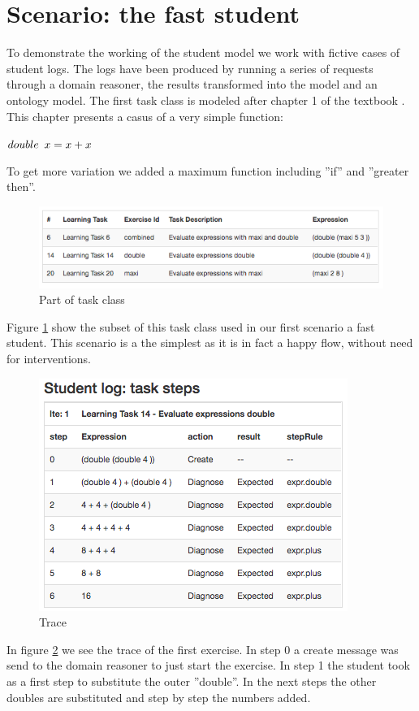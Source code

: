 \section{Scenario: the fast student}

To demonstrate the working of the student model  we work with fictive cases of student logs.
The logs have been produced by running a series of requests through a domain reasoner, the results transformed into the model and an ontology model.
The first task class is modeled after chapter 1 of the textbook \citep{hutton_2016}.
This chapter presents a casus of a very simple function:
\vspace{10pt}

$double  \hspace{5 pt} x = x + x$
\vspace{10pt}

To get more variation we added a maximum function including ''if'' and ''greater then''.

\begin{figure}
\includegraphics[scale=0.85]{pictures/screen01.png}
\caption{Part of task class}
\label{fig:screen01}
\end{figure}

Figure \ref{fig:screen01} show the subset of this task class used in our first scenario a fast student.
This scenario is a the simplest as it is in fact a happy flow, without need for interventions.

\begin{figure}
\includegraphics[scale=1.0]{pictures/screen02.png}
\caption{Trace}
\label{fig:trace01}
\end{figure}
In figure \ref{fig:trace01} we see the trace of the first exercise.
In step 0 a create message was send to the domain reasoner to just start the exercise.
In step 1 the student took as a first step to substitute the outer ''double''.
In the next steps the other doubles are substituted and step by step the numbers added.

